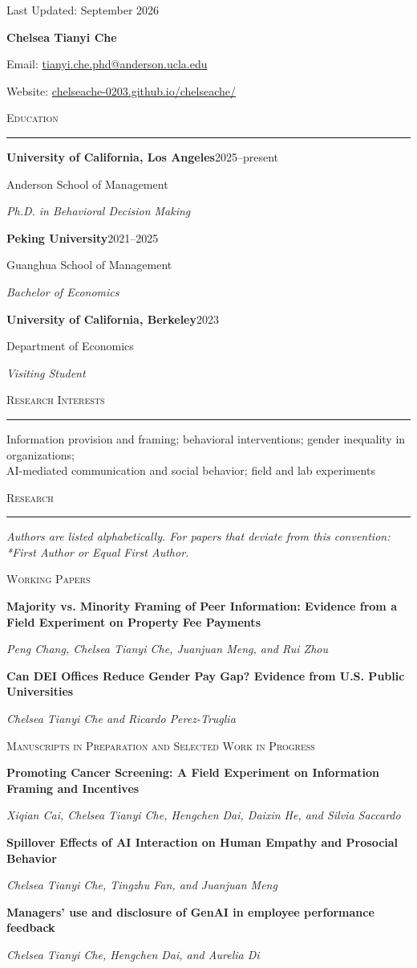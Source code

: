 \documentclass[10pt]{article}
\newcommand{\cvwebsite}{\href{https://chelseache-0203.github.io/chelseache/}{chelseache-0203.github.io/chelseache/}}
\newcommand{\supporttext}[1]{{\normalsize #1}}
\newcommand{\supportemph}[1]{{\normalsize\emph{#1}}}
\newcommand{\cvsection}[1]{%
  \vspace{1.18em}%
  {\Large\scshape #1\par}%
  \vspace{0.08em}%
  {\color{rulegray}\rule{\textwidth}{0.35pt}\par}%
  \vspace{0.18em}%
}
\newcommand{\cvsubsection}[1]{%
  \vspace{0.7em}%
  {\large\scshape #1\par}%
  \vspace{0.3em}%
}
\newcommand{\educationentry}[4]{%
  \textbf{#1}\hfill #2\par
  \supporttext{#3}\par
  \supportemph{#4}\par
  \vspace{0.46em}%
}
\newcommand{\researchentry}[3]{%
  \textbf{#1}\par
  \vspace{0.1em}%
  \supportemph{#2}\par
  \if\relax\detokenize{#3}\relax
  \else
    \vspace{0.07em}%
    \supporttext{#3}\par
  \fi
  \vspace{0.72em}%
}
\newcommand{\sectiontail}[1]{\vspace{#1}}
\begin{document}
{\small\color{muted}\hfill Last Updated: September 2026\par}
\vspace{0.84em}

\begin{center}
{\LARGE\bfseries Chelsea Tianyi Che\par}
\vspace{0.42em}
{\normalsize Email: \href{mailto:tianyi.che.phd@anderson.ucla.edu}{tianyi.che.phd@anderson.ucla.edu}\par}
\vspace{0.16em}
{\normalsize Website: \cvwebsite\par}
\end{center}

\cvsection{Education}
\educationentry{University of California, Los Angeles}{2025--present}{Anderson School of Management}{Ph.D. in Behavioral Decision Making}
\educationentry{Peking University}{2021--2025}{Guanghua School of Management}{Bachelor of Economics}
\educationentry{University of California, Berkeley}{2023}{Department of Economics}{Visiting Student}
\sectiontail{0.26em}

\cvsection{Research Interests}
Information provision and framing; behavioral interventions; gender inequality in organizations;\\
AI-mediated communication and social behavior; field and lab experiments
\sectiontail{0.72em}

\cvsection{Research}
{\small\emph{Authors are listed alphabetically. For papers that deviate from this convention: *First Author or Equal First Author.}\par}
\cvsubsection{Working Papers}
\researchentry{Majority vs. Minority Framing of Peer Information: Evidence from a Field Experiment on Property Fee Payments}{Peng Chang, Chelsea Tianyi Che, Juanjuan Meng, and Rui Zhou}{}
\researchentry{Can DEI Offices Reduce Gender Pay Gap? Evidence from U.S. Public Universities}{Chelsea Tianyi Che and Ricardo Perez-Truglia}{}

\cvsubsection{Manuscripts in Preparation and Selected Work in Progress}
\researchentry{Promoting Cancer Screening: A Field Experiment on Information Framing and Incentives}{Xiqian Cai, Chelsea Tianyi Che, Hengchen Dai, Daixin He, and Silvia Saccardo}{}
\researchentry{Spillover Effects of AI Interaction on Human Empathy and Prosocial Behavior}{Chelsea Tianyi Che, Tingzhu Fan, and Juanjuan Meng}{}
\researchentry{Managers' use and disclosure of GenAI in employee performance feedback}{Chelsea Tianyi Che, Hengchen Dai, and Aurelia Di}{}
\end{document}
